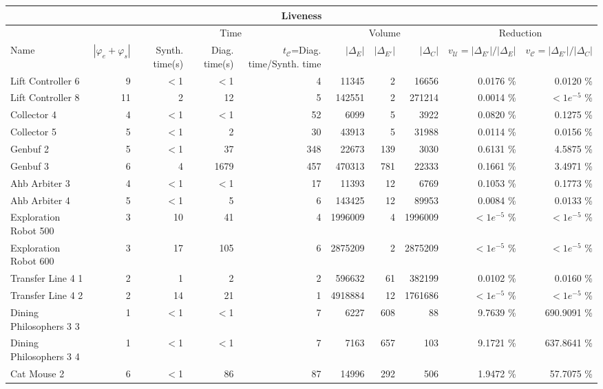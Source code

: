 \begin{tabular}{|l|r|rrr|rrr|rr|}
  \hline \multicolumn{10}{c|}{Liveness} \\ 
\hline	
  \hline & & \multicolumn{3}{c|}{Time}&\multicolumn{3}{c|}{Volume} & \multicolumn{2}{c|}{Reduction}\\ \hline
Name & $|\varphi_e + \varphi_s|$ & Synth. time(s) & Diag. time(s) & $t_{\mathcal{C}}$=Diag. time/Synth. time & $|\Delta_E|$ & $|\Delta_{E'}|$ & $|\Delta_{C}|$ & $v_{\mathcal{U}}=|\Delta_{E'}|/|\Delta_{E}|$ & $v_{\mathcal{C}}=|\Delta_{E'}|/|\Delta_{C}|$ \\ 
  \hline
  Lift Controller 6 &   9 & $<$1 & $<$1 & 4 & 11345 & 2 & 16656 &  0.0176 \% &    0.0120 \% \\ 
Lift Controller 8 &  11 & 2 & 12 & 5 & 142551 & 2 & 271214 &  0.0014 \% & $<1e^{-5}$ \% \\ 
  Collector 4 &   4 & $<$1 & $<$1 & 52 & 6099 & 5 & 3922 &  0.0820 \% &    0.1275 \% \\ 
Collector 5 &   5 & $<$1 & 2 & 30 & 43913 & 5 & 31988 &  0.0114 \% &    0.0156 \% \\ 
  Genbuf 2 &   5 & $<$1 & 37 & 348 & 22673 & 139 & 3030 &  0.6131 \% &    4.5875 \% \\ 
Genbuf 3 &   6 & 4 & 1679 & 457 & 470313 & 781 & 22333 &  0.1661 \% &    3.4971 \% \\ 
Ahb Arbiter 3 &   4 & $<$1 & $<$1 & 17 & 11393 & 12 & 6769 &  0.1053 \% &    0.1773 \% \\ 
  Ahb Arbiter 4 &   5 & $<$1 & 5 & 6 & 143425 & 12 & 89953 &  0.0084 \% &    0.0133 \% \\ 
  Exploration Robot 500 &   3 & 10 & 41 & 4 & 1996009 & 4 & 1996009 & $<1e^{-5}$ \% & $<1e^{-5}$ \% \\ 
Exploration Robot 600 &   3 & 17 & 105 & 6 & 2875209 & 2 & 2875209 & $<1e^{-5}$ \% & $<1e^{-5}$ \% \\ 
  Transfer Line 4 1 &   2 & 1 & 2 & 2 & 596632 & 61 & 382199 &  0.0102 \% &    0.0160 \% \\ 
Transfer Line 4 2 &   2 & 14 & 21 & 1 & 4918884 & 12 & 1761686 & $<1e^{-5}$ \% & $<1e^{-5}$ \% \\ 
  Dining Philosophers 3 3 &   1 & $<$1 & $<$1 & 7 & 6227 & 608 &  88 &  9.7639 \% &  690.9091 \% \\ 
Dining Philosophers 3 4 &   1 & $<$1 & $<$1 & 7 & 7163 & 657 & 103 &  9.1721 \% &  637.8641 \% \\ 
  Cat Mouse 2 &   6 & $<$1 & 86 & 87 & 14996 & 292 & 506 &  1.9472 \% &   57.7075 \% \\ 

\end{tabular}
